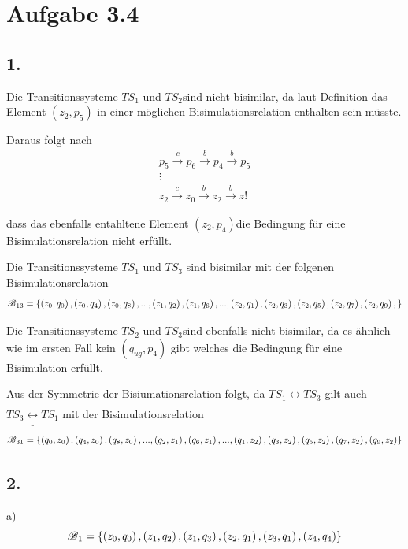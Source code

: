 \documentclass[12pt, paper=a4]{article}
\begin{document}
\section*{Aufgabe 3.4}

\subsection*{1.}

	Die Transitionssysteme $TS_{1}$ und $TS_{2}$sind nicht bisimilar,
	da laut Definition das Element $\left(z_{2},p_{5}\right)$ in einer
	möglichen Bisimulationsrelation enthalten sein müsste. 

	Daraus folgt nach 
	\begin{gather*}
		p_{5}\stackrel{c}{\rightarrow}p_{6}\stackrel{b}{\rightarrow}p_{4}\stackrel{b}{\rightarrow}p_{5}\\
		\vdots\\
		z_{2}\stackrel{c}{\rightarrow}z_{0}\stackrel{b}{\rightarrow}z_{2}\stackrel{b}{\rightarrow}z!
	\end{gather*}


	dass das ebenfalls entahltene Element $\left(z_{2},p_{4}\right)$die
	Bedingung für eine Bisimulationsrelation nicht erfüllt.

	Die Transitionssysteme $TS_{1}$ und $TS_{3}$ sind bisimilar mit
	der folgenen Bisimulationsrelation 
	\[
		\text{\ensuremath{\mathscr{B}}}_{13}=\left\{ \left(z_{0},q_{0}\right),\left(z_{0},q_{4}\right),\left(z_{0},q_{8}		\right),...,\left(z_{1},q_{2}\right),\left(z_{1},q_{6}\right),...,\left(z_{2},q_{1}\right),\left(z_{2},q_{3}			\right),\left(z_{2},q_{5}\right),\left(z_{2},q_{7}\right),\left(z_{2},q_{9}\right),\right\} 
	\]
	
	Die Transitionssysteme $TS_{2}$ und $TS_{3}$sind ebenfalls nicht
	bisimilar, da es ähnlich wie im ersten Fall kein $\left(q_{ug},p_{4}\right)$
	gibt welches die Bedingung für eine Bisimulation erfüllt.

	Aus der Symmetrie der Bisiumationsrelation folgt, da $TS_{1}\underline{\leftrightarrow}TS_{3}$
	gilt auch $TS_{3}\underline{\leftrightarrow}TS_{1}$ mit der Bisimulationsrelation
	\[
	\text{\ensuremath{\mathscr{B}}}_{31}=\left\{ \left(q_{0},z_{0}\right),\left(q_{4},z_{0}\right),\left(q_{8},z_{0}		\right),...,\left(q_{2},z_{1}\right),\left(q_{6},z_{1}\right),...,\left(q_{1},z_{2}\right),\left(q_{3},z_{2}\right),		\left(q_{5},z_{2}\right),\left(q_{7},z_{2}\right),\left(q_{9},z_{2}\right)\right\} 
	\]

\subsection*{2.}
a) 
\[
\text{\ensuremath{\mathscr{B}}}_{1}=\left\{ \left(z_{0},q_{0}\right),\left(z_{1},q_{2}\right),\left(z_{1},q_{3}\right),\left(z_{2},q_{1}\right),\left(z_{3},q_{1}\right),\left(z_{4},q_{4}\right)\right\} 
\]
\end{document}
